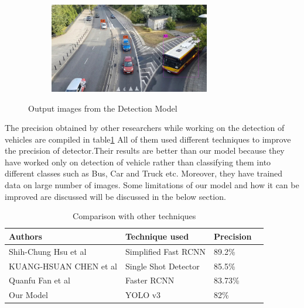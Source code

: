 \begin{figure}
    \quad
    \begin{subfigure}[t]{0.475\textwidth}   
        \centering 
        \includegraphics[width = 7cm, height = 5 cm]{CHAPTERS/Chapter-5/images/5.12d.jpg}
        \caption[]%
        {{\small }}    
        \label{fig:mean and std of net44}
    \end{subfigure}
    \caption[ ]
    {\small Output images from the Detection Model}
    \label{fig:5.12}
\end{figure}
 The precision obtained by other researchers while working on the detection of vehicles are 
 compiled in table\ref{table:5.3}  All of them used different techniques to improve the precision of detector.Their results are better than our model because they have worked only on detection of vehicle rather than classifying them into different classes such as Bus, Car and Truck etc. Moreover, they have trained data on large number of images. Some limitations of our model and how it can be improved are discussed will be discussed in the below section.
 \begin{table}[H]
	\caption{Comparison with other techniques}
	\label{table:5.3}
	  \begin{center}
		\scalebox{1}
		{\begin{tabular}{|l |l |l |l |}
	    \hline
	    Authors  & Technique used &  Precision
		\\ \hline
		Shih-Chung Hsu et al \cite{chap_5_article:4} & Simplified Fast RCNN & 89.2\%
		\\ \hline
		KUANG-HSUAN CHEN et al \cite{chap_5_article:5} & Single Shot Detector & 85.5\%
		\\ \hline  
		Quanfu Fan et al \cite{chap_5_article:6} & Faster RCNN & 83.73\%
		\\ \hline
		Our Model & YOLO v3 & 82\%
		\\ \hline
		
		\end{tabular}}
	  \end{center}
\end{table}

